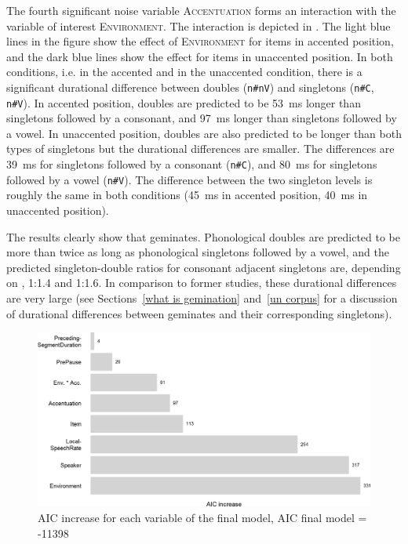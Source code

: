 The fourth significant noise variable \textsc{Accentuation} forms an interaction with the variable of interest \textsc{Environment}. The interaction is depicted in .
The light blue lines in the figure show the effect of \textsc{Environment} for items in accented position, and the dark blue lines show the effect for items in unaccented position. In both conditions, i.e. in the accented and in the unaccented condition, there is a significant durational difference between doubles (\texttt{n\#nV}) and singletons (\texttt{n\#C}, \texttt{n\#V}). 
 In accented position, doubles are predicted to be 53~ms longer than singletons followed by a consonant, and 97~ms longer than singletons followed by a vowel. 
 In unaccented position, doubles are also predicted to be longer than both types of singletons but the durational differences are smaller. The differences are 39~ms  for singletons followed by a consonant (\texttt{n\#C}), and 80~ms for singletons followed by a vowel (\texttt{n\#V}). The difference between the two singleton levels is roughly the same in both conditions (45~ms in accented position, 40~ms in unaccented position).




 The results clearly show that  geminates. Phonological doubles are predicted to be more than twice as long as phonological singletons followed by a vowel, and the predicted singleton-double ratios for consonant adjacent singletons are, depending on , 1:1.4 and 1:1.6. In comparison to former studies, these durational differences are very large (see Sections~\ref{what is gemination} and~\ref{un corpus} for a discussion of durational differences between geminates and their corresponding singletons). 




\begin{figure}
	
	
	\includegraphics[scale=0.7] {images/Experiment/AICdecreaseUnComplex.png}


	\caption{AIC increase for each variable of the final model, AIC final model = -11398}
	\label{fig:Effect sozed un Exp unV vs Unn}

\end{figure}



